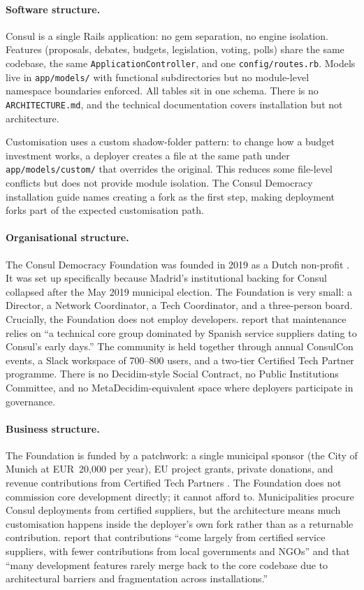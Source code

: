 \documentclass[11pt,a4paper]{article}
\begin{document}
\paragraph{Software structure.}
Consul is a single Rails application: no gem separation, no engine isolation. Features (proposals, debates, budgets, legislation, voting, polls) share the same codebase, the same \texttt{ApplicationController}, and one \texttt{config/routes.rb}. Models live in \texttt{app/models/} with functional subdirectories but no module-level namespace boundaries enforced. All tables sit in one schema. There is no \texttt{ARCHITECTURE.md}, and the technical documentation covers installation but not architecture.

Customisation uses a custom shadow-folder pattern: to change how a budget investment works, a deployer creates a file at the same path under \texttt{app/models/custom/} that overrides the original. This reduces some file-level conflicts but does not provide module isolation. The Consul Democracy installation guide names creating a fork as the first step, making deployment forks part of the expected customisation path.

\paragraph{Organisational structure.}
The Consul Democracy Foundation was founded in 2019 as a Dutch non-profit \citep{linaker2025consul}. It was set up specifically because Madrid's institutional backing for Consul collapsed after the May 2019 municipal election. The Foundation is very small: a Director, a Network Coordinator, a Tech Coordinator, and a three-person board. Crucially, the Foundation does not employ developers. \citet{linaker2025consul} report that maintenance relies on ``a technical core group dominated by Spanish service suppliers dating to Consul's early days.'' The community is held together through annual ConsulCon events, a Slack workspace of 700--800 users, and a two-tier Certified Tech Partner programme. There is no Decidim-style Social Contract, no Public Institutions Committee, and no MetaDecidim-equivalent space where deployers participate in governance.

\paragraph{Business structure.}
The Foundation is funded by a patchwork: a single municipal sponsor (the City of Munich at EUR~20{,}000 per year), EU project grants, private donations, and revenue contributions from Certified Tech Partners \citep{linaker2025consul}. The Foundation does not commission core development directly; it cannot afford to. Municipalities procure Consul deployments from certified suppliers, but the architecture means much customisation happens inside the deployer's own fork rather than as a returnable contribution. \citet{linaker2025consul} report that contributions ``come largely from certified service suppliers, with fewer contributions from local governments and NGOs'' and that ``many development features rarely merge back to the core codebase due to architectural barriers and fragmentation across installations.''
\end{document}
